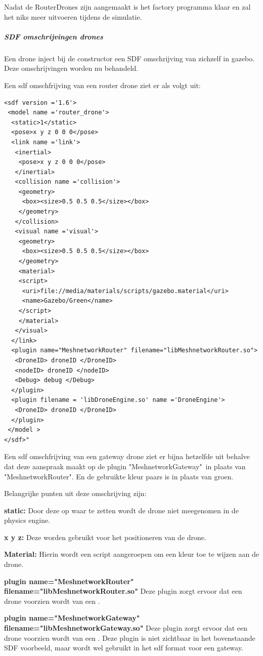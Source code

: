 \documentclass[a4paper, 11pt, oneside]{report}
\begin{document}
Nadat de RouterDrones zijn aangemaakt is het factory programma klaar en zal het niks meer uitvoeren tijdens de simulatie.

\subparagraph{SDF omschrijvingen drones}
\label{DetailedDesign:MeshNetwerk:sequence:dronefactory:droneomschrijvingen}
Een drone inject bij de constructor een SDF omschrijving van zichzelf in gazebo.
Deze omschrijvingen worden nu behandeld.

Een sdf omschfrijving van een router drone ziet er als volgt uit:
\begin{lstlisting}
<sdf version ='1.6'>
 <model name ='router_drone'>
  <static>1</static>
  <pose>x y z 0 0 0</pose>
  <link name ='link'>
   <inertial>
    <pose>x y z 0 0 0</pose>
   </inertial>
   <collision name ='collision'>
    <geometry>
     <box><size>0.5 0.5 0.5</size></box>
    </geometry>
   </collision>
   <visual name ='visual'>
    <geometry>
     <box><size>0.5 0.5 0.5</size></box>
    </geometry>
    <material>
    <script>
     <uri>file://media/materials/scripts/gazebo.material</uri>
     <name>Gazebo/Green</name>
    </script>
    </material>
   </visual>
  </link>
  <plugin name="MeshnetworkRouter" filename="libMeshnetworkRouter.so">
   <DroneID> droneID </DroneID>
   <nodeID> droneID </nodeID>
   <Debug> debug </Debug>
  </plugin>
  <plugin filename = 'libDroneEngine.so' name ='DroneEngine'>
   <DroneID> droneID </DroneID> 
  </plugin>
 </model >
</sdf>"
\end{lstlisting} 

Een sdf omschfrijving van een gateway drone ziet er bijna hetzelfde uit behalve dat deze aanspraak maakt op de plugin "MeshnetworkGateway"\ in plaats van "MeshnetworkRouter".  En de gebruikte kleur paars is in plaats van groen.

Belangrijke punten uit deze omschrijving zijn:

\textbf{static:} Door deze op waar te zetten wordt de drone niet meegenomen in de physics engine.

\textbf{x y z: } Deze worden gebruikt voor het positioneren van de drone.

\textbf{Material:} Hierin wordt een script aangeroepen om een kleur toe te wijzen aan de drone.

\textbf{plugin name="MeshnetworkRouter" filename="libMeshnetworkRouter.so"} Deze plugin zorgt ervoor dat een drone voorzien wordt van een .

\textbf{plugin name="MeshnetworkGateway" filename="libMeshnetworkGateway.so"} Deze plugin zorgt ervoor dat een drone voorzien wordt van een . Deze plugin is niet zichtbaar in het bovenstaande SDF voorbeeld, maar wordt wel gebruikt in het sdf format voor een gateway. 
\end{document}
